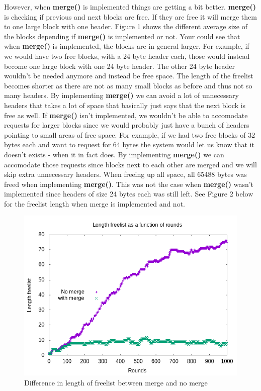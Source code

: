 \documentclass[12pt, letterpaper]{article}
\begin{document}
However, when \textbf{merge()} is implemented things are getting a bit better. \textbf{merge()} is checking if previous and next blocks are free. 
If they are free it will merge them to one large block with one header. Figure 1 shows the different average size of the blocks depending if \textbf{merge()} is implemented or 
not. Your could see that when \textbf{merge()} is implemented, the blocks are in general larger. For example, if we would have two free blocks, with a 24 byte header each, 
those would instead become one large block with one 24 byte header. The other 24 byte header wouldn't be needed anymore and instead be free space. 
The length of the freelist becomes shorter as there are not as many small blocks as before and thus not so many headers. By implementing \textbf{merge()} we can 
avoid a lot of unnecessary headers that takes a lot of space that basically just says that the next block is free as well. If \textbf{merge()} isn't implemented, we wouldn't
be able to accomodate requests for larger blocks since we would probably just have a bunch of headers pointing to small areas of free space.
For example, if we had two free blocks of 32 bytes each and want to request for 64 bytes the system would let us know that it doesn't exists - when it in fact does. 
By implementing \textbf{merge()} we can accomodate those requests since blocks next to each other are merged and we will skip extra unnecessary headers. 
When freeing up all space, all 65488 bytes was freed when implementing \textbf{merge()}. This was not the case when \textbf{merge()} wasn't implemented since headers of size 24 bytes each was still left.
See Figure 2 below for the freelist length when merge is implemented and not.
\begin{figure}[h]
    \center
    \includegraphics[scale=0.65]{graph1.png}
    \caption{Difference in length of freelist between merge and no merge}
    \label{fig:graph1}
\end{figure}
\end{document}
